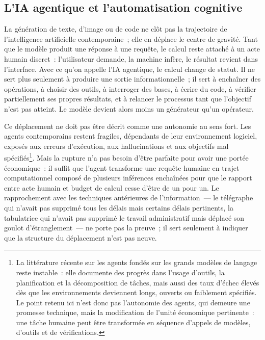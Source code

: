 \subsection{L'IA agentique et l'automatisation cognitive}\label{subsec:agentique}

%
La génération de texte, d'image ou de code ne clôt pas la trajectoire de l'intelligence artificielle contemporaine~; elle en déplace le centre de gravité. Tant que le modèle produit une réponse à une requête, le calcul reste attaché à un acte humain discret~: l'utilisateur demande, la machine infère, le résultat revient dans l'interface. Avec ce qu'on appelle l'IA agentique, le calcul change de statut. Il ne sert plus seulement à produire une sortie informationnelle~; il sert à enchaîner des opérations, à choisir des outils, à interroger des bases, à écrire du code, à vérifier partiellement ses propres résultats, et à relancer le processus tant que l'objectif n'est pas atteint. Le modèle devient alors moins un générateur qu'un opérateur.

Ce déplacement ne doit pas être décrit comme une autonomie au sens fort. Les agents contemporains restent fragiles, dépendants de leur environnement logiciel, exposés aux erreurs d'exécution, aux hallucinations et aux objectifs mal spécifiés\footnote{La littérature récente sur les agents fondés sur les grands modèles de langage reste instable~: elle documente des progrès dans l'usage d'outils, la planification et la décomposition de tâches, mais aussi des taux d'échec élevés dès que les environnements deviennent longs, ouverts ou faiblement spécifiés. Le point retenu ici n'est donc pas l'autonomie des agents, qui demeure une promesse technique, mais la modification de l'unité économique pertinente~: une tâche humaine peut être transformée en séquence d'appels de modèles, d'outils et de vérifications.}. Mais la rupture n'a pas besoin d'être parfaite pour avoir une portée économique~: il suffit que l'agent transforme une requête humaine en trajet computationnel composé de plusieurs inférences enchaînées pour que le rapport entre acte humain et budget de calcul cesse d'être de un pour un. Le rapprochement avec les techniques antérieures de l'information~--- le télégraphe qui n'avait pas supprimé tous les délais mais certains délais pertinents, la tabulatrice qui n'avait pas supprimé le travail administratif mais déplacé son goulot d'étranglement~--- ne porte pas la preuve~; il sert seulement à indiquer que la structure du déplacement n'est pas neuve.


